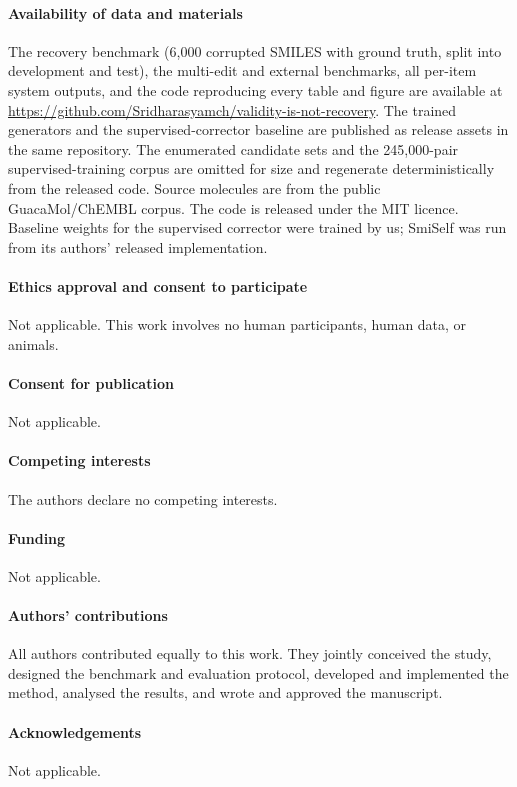 \documentclass[conference]{IEEEtran}
\begin{document}
\paragraph{Availability of data and materials}
The recovery benchmark (6{,}000 corrupted SMILES with ground truth, split into
development and test), the multi-edit and external benchmarks, all per-item
system outputs, and the code reproducing every table and figure are available at
\url{https://github.com/Sridharasyamch/validity-is-not-recovery}. The trained
generators and the supervised-corrector baseline are published as release assets
in the same repository. The enumerated candidate sets and the 245{,}000-pair
supervised-training corpus are omitted for size and regenerate deterministically
from the released code. Source molecules are from the public GuacaMol/ChEMBL
corpus. The code is released under the MIT licence.
Baseline weights for the supervised corrector were trained by us; SmiSelf was run
from its authors' released implementation.

\paragraph{Ethics approval and consent to participate}
Not applicable. This work involves no human participants, human data, or animals.

\paragraph{Consent for publication}
Not applicable.

\paragraph{Competing interests}
The authors declare no competing interests.

\paragraph{Funding}
Not applicable.

\paragraph{Authors' contributions}
All authors contributed equally to this work. They jointly conceived the study,
designed the benchmark and evaluation protocol, developed and implemented the
method, analysed the results, and wrote and approved the manuscript.

\paragraph{Acknowledgements}
Not applicable.

\clearpage


\end{document}
